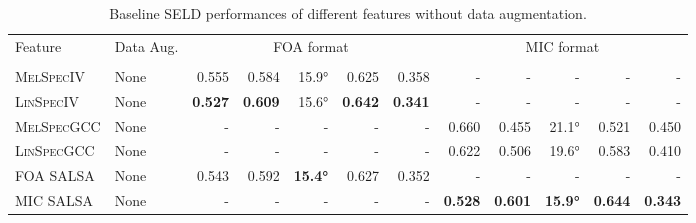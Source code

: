 \documentclass[journal]{IEEEtran}
\begin{document}
\begin{table*}[t]
    \centering
    \caption{Baseline SELD performances of different features without data augmentation.}
    \noindent\begin{tabularx}{\textwidth}{Xl rrrrr rrrrr}
    \toprule 
        \multirow{2}[2]{*}{Feature} & 
        \multirow{2}[2]{*}{Data Aug.} &  
        \multicolumn{5}{c}{FOA format} &
        \multicolumn{5}{c}{MIC format}
    \\ \cmidrule(lr){3-7}\cmidrule(lr){8-12}
        & & 
          &
          &
         &
          &
          &
          &
          &
         &
          &
         
        \\ \midrule
        \textsc{MelSpecIV}   & None 
                    & 0.555 & 0.584 & 15.9\si{\degree} & 0.625 & 0.358 
                    & - & - & - & - & - \\
        \textsc{LinSpecIV}   & None
                    & \bf{0.527} & \bf{0.609} & 15.6\si{\degree} & \bf{0.642} & \bf{0.341}
                    & - & - & - & - & - \\
        \textsc{MelSpecGCC}  & None
                    & - & - & - & - & - 
                    & 0.660 & 0.455 & 21.1\si{\degree} & 0.521 & 0.450 \\ 
        \textsc{LinSpecGCC}  & None
                    & - & - & - & - & - 
                    & 0.622 & 0.506 & 19.6\si{\degree} & 0.583 & 0.410 \\
        \midrule
        FOA SALSA       & None
                    & 0.543 & 0.592 & \bf{15.4\si{\degree}} & 0.627 & 0.352 
                    & - & - & - & - & -  \\
        MIC SALSA       & None
                    & - & - & - & - & - 
                    & \bf{0.528} & \bf{0.601} & \bf{15.9\si{\degree}} & \bf{0.644} & \bf{0.343} \\
    \bottomrule
    \end{tabularx}
    \label{tab:baseline_noaug}
\end{table*}
\end{document}
